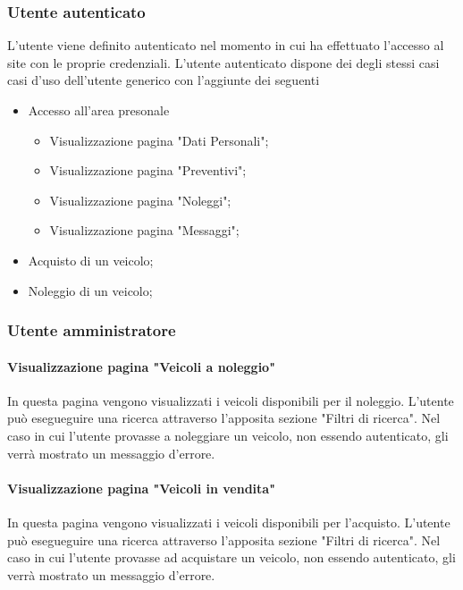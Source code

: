         \subsubsection{Utente autenticato}
        L’utente viene definito autenticato nel momento in cui ha effettuato l'accesso al site con le proprie credenziali.
        L’utente autenticato dispone dei degli stessi casi casi d’uso dell'utente generico con l'aggiunte dei seguenti
        \begin{itemize}
            \item Accesso all'area presonale
            \begin{itemize}
                \item Visualizzazione pagina "Dati Personali";
                \item Visualizzazione pagina "Preventivi";
                \item Visualizzazione pagina "Noleggi";
                \item Visualizzazione pagina "Messaggi";
            \end{itemize}
            \item Acquisto di un veicolo;
            \item Noleggio di un veicolo;
        \end{itemize}

        \subsubsection{Utente amministratore}

        \paragraph{Visualizzazione pagina "Veicoli a noleggio"}
        In questa pagina vengono visualizzati i veicoli disponibili per il noleggio. L'utente può esegueguire una ricerca attraverso l'apposita sezione "Filtri di ricerca". Nel caso in cui l'utente provasse a noleggiare un veicolo, non essendo autenticato, gli verrà mostrato un messaggio d'errore.

        \paragraph{Visualizzazione pagina "Veicoli in vendita"}
        In questa pagina vengono visualizzati i veicoli disponibili per l'acquisto. L'utente può esegueguire una ricerca attraverso l'apposita sezione "Filtri di ricerca". Nel caso in cui l'utente provasse ad acquistare un veicolo, non essendo autenticato, gli verrà mostrato un messaggio d'errore.

